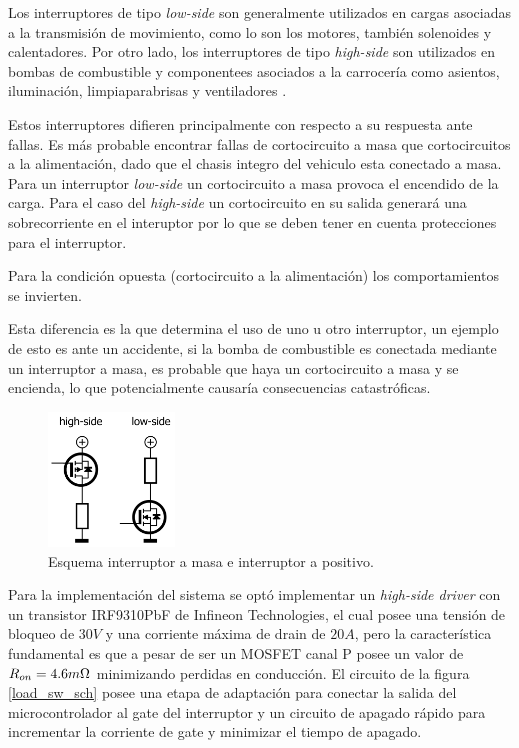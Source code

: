 \documentclass[10pt, a4paper]{article}
\begin{document}
Los interruptores de tipo \emph{low-side} son generalmente utilizados en cargas
asociadas a la transmisión de movimiento, como lo son los motores, también
solenoides y calentadores. Por otro lado, los interruptores de tipo
\emph{high-side} son utilizados en bombas de combustible y componentees
asociados a la carrocería como asientos, iluminación, limpiaparabrisas y
ventiladores \cite{DigKey2016}.

Estos interruptores difieren principalmente con respecto a su respuesta ante
fallas. Es más probable encontrar fallas de cortocircuito a masa que
cortocircuitos a la alimentación, dado que el chasis integro del vehiculo esta
conectado a masa. Para un interruptor \emph{low-side} un cortocircuito a masa
provoca el encendido de la carga. Para el caso del \emph{high-side} un
cortocircuito en su salida generará una sobrecorriente en el interuptor por lo
que se deben tener en cuenta protecciones para el interruptor.

Para la condición opuesta (cortocircuito a la alimentación) los comportamientos
se invierten.

Esta diferencia es la que determina el uso de uno u otro interruptor, un ejemplo
de esto es ante un accidente, si la bomba de combustible es conectada mediante
un interruptor a masa, es probable que haya un cortocircuito a masa y se
encienda, lo que potencialmente causaría consecuencias catastróficas.

\begin{figure}[h!]
	\begin{center}
		\includegraphics[width=0.30\textwidth]{low_high_driver_sch.png}
		\caption{Esquema interruptor a masa e interruptor a positivo.}
		\label{low_high_driver_sch}
	\end{center}
\end{figure}
\FloatBarrier

Para la implementación del sistema se optó implementar un \emph{high-side
driver} con un transistor IRF9310PbF de Infineon Technologies, el cual posee una
tensión de bloqueo de $30V$ y una corriente máxima de drain de $20A$, pero la
característica fundamental es que a pesar de ser un MOSFET canal P posee un
valor de $R_{on}=4.6 m\ohm$ minimizando perdidas en conducción. El circuito de
la figura \ref{load_sw_sch} posee una etapa de adaptación para conectar la
salida del microcontrolador al gate del interruptor y un circuito de apagado
rápido para incrementar la corriente de gate y minimizar el tiempo de apagado.
\end{document}
